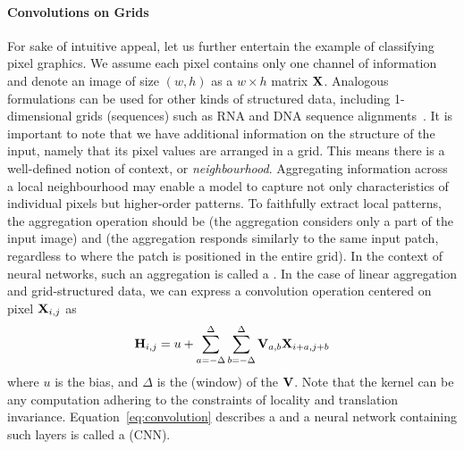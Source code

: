 \documentclass[
	fontsize=10pt, %
	twoside=false, %
	secnumdepth=1, %
  toc=indentunnumbered %
]{kaobook}
\begin{document}
\paragraph{Convolutions on Grids}
For sake of intuitive appeal, let us further entertain the example of
classifying pixel graphics. We assume each pixel contains only one channel of
information and denote an image of size $(w,h)$ as a $w \times h$ matrix $\mathbf{X}$. Analogous formulations can be used for other kinds of structured data,
including 1-dimensional grids (sequences) such as RNA and DNA sequence
alignments~\cite{flagel_UnreasonableEffectivenessConvolutional_2019,aoki_ConvolutionalNeuralNetworks_2018}.
It is important to note that we have additional information on the structure of
the input,
namely that its pixel values are arranged in a grid. This means there is a
well-defined notion of context, or \textit{neighbourhood}.
%
Aggregating information across a local neighbourhood may enable
a model to capture not only characteristics of individual pixels but
higher-order patterns. To faithfully extract local patterns, the aggregation
operation should be  (the aggregation considers only a part of the
input image) and  (the aggregation responds
similarly to the same input patch, regardless to where the patch is positioned in the
entire grid). In the context of neural networks, such an aggregation is called a
 \cite{zhang_dive_nodate}. In the case of linear aggregation
and grid-structured data, we can express a convolution operation centered on pixel $\mathbf{X}_{i,j}$ as
\begin{align}
  \mathbf{H}_{i,j} = u + \sum_{a= -\Delta}^\Delta \sum_{b = -\Delta}^\Delta \mathbf{V}_{a,b} \mathbf{X}_{i+a,j+b}
  \label{eq:convolution}
\end{align}
where $u$ is the bias, and $\Delta$ is the (window)  of the
 $\mathbf{V}$.
%
Note that the kernel can be any
computation adhering to the constraints of locality and translation invariance.
%
Equation~\ref{eq:convolution} describes a
 and a neural network containing such layers is called
a  (CNN).
\end{document}

